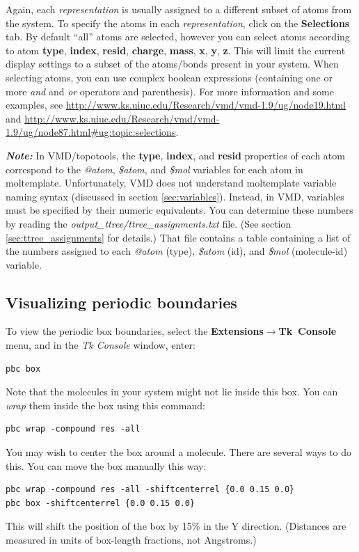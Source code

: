 \documentclass[11pt]{article}
\begin{document}
Again, each \textit{representation} is usually assigned to
a different subset of atoms from the system.
To specify the atoms in each \textit{representation}, 
click on the \mbox{\textbf{Selections}} tab.
By default ``all''
atoms are selected, however you can select atoms according to atom 
\textbf{type}, \textbf{index}, \textbf{resid}, 
\textbf{charge}, \textbf{mass}, \textbf{x}, \textbf{y}, \textbf{z}.
This will limit the current display settings to a 
subset of the atoms/bonds present in your system.
When selecting atoms, you can use complex boolean expressions 
(containing one or more \textit{and} and \textit{or} operators 
and parenthesis).
For more information and some examples, 
see \url{http://www.ks.uiuc.edu/Research/vmd/vmd-1.9/ug/node19.html}
and
\url{http://www.ks.uiuc.edu/Research/vmd/vmd-1.9/ug/node87.html#ug:topic:selections}.


\textit{\textbf{Note:}}
In VMD/topotools, 
the \textbf{type}, \textbf{index}, and \textbf{resid} 
properties of each atom correspond 
to the \textit{@atom}, \textit{\$atom}, and \textit{\$mol} 
variables for each atom in moltemplate.
Unfortunately, VMD does not understand moltemplate variable naming syntax
(discussed in section \ref{sec:variables}). 
Instead, in VMD, variables must be 
specified by their numeric equivalents. 
You can determine these numbers by reading the 
\textit{output\_ttree/ttree\_assignments.txt} file.
(See section \ref{sec:ttree_assignments} for details.)
That file contains a table containing a list of the
numbers assigned to each \textit{@atom} (type), \textit{\$atom} (id),
and \textit{\$mol} (molecule-id) variable.





\subsection{Visualizing periodic boundaries}
\label{sec:vmd_pbc}
To view the periodic box boundaries, 
select the \textbf{Extensions}$\rightarrow$\mbox{\textbf{Tk Console}} menu,
and in the \textit{Tk Console} window, enter:
\begin{verbatim}
pbc box
\end{verbatim}
Note that the molecules in your system might not lie inside this box.
You can \textit{wrap} them inside the box using this command:
\begin{verbatim}
pbc wrap -compound res -all
\end{verbatim}
You may wish to center the box around a molecule.  There are several ways to
do this.  You can move the box manually this way:
\begin{verbatim}
pbc wrap -compound res -all -shiftcenterrel {0.0 0.15 0.0}
pbc box -shiftcenterrel {0.0 0.15 0.0}
\end{verbatim}
This will shift the position of the box by 15\% in the Y direction.
(Distances are measured in units of box-length fractions, not Angstroms.)
\end{document}

